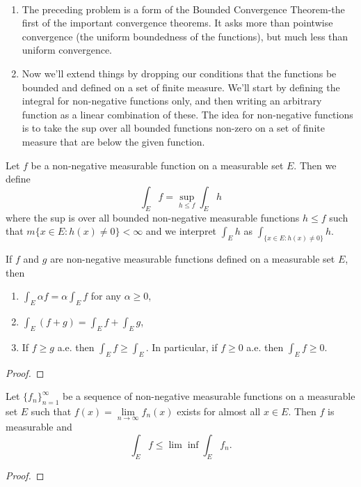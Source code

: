 \begin{rmk}~ %
\begin{enumerate}
	\item The preceding problem is a form of the Bounded Convergence Theorem-the first of 
	the important convergence theorems. It asks more than pointwise convergence (the 
	uniform boundedness of the functions), but much less than uniform convergence. 
	\item Now we'll extend things by dropping our conditions that the functions be bounded 
	and defined on a set of finite measure. We'll start by defining the integral for non-negative 
	functions only, and then writing an arbitrary function as a linear combination of these. The 
	idea for non-negative functions is to take the sup over all bounded functions non-zero on a set 
	of finite measure that are below the given function.
\end{enumerate}
\end{rmk}

\begin{defn}\label{d:thehundred}%
	Let $f$ be a non-negative measurable function on a measurable set $E$. Then we define 
	\begin{equation*}
		\int_E f = \sup\limits_{h\le f}\int_E h
	\end{equation*}
	where the sup is over all bounded non-negative measurable functions $h \le f$ such that 
	$m\{x \in E: h(x) \neq 0\} < \infty$ and we interpret $\int_E h$ as 
	$\int_{\{x\in E:h(x)\neq0\}}h$. 
\end{defn}

\begin{pblm}\label{p:conditionsnonnegmeasu}%
	If $f$ and $g$ are non-negative measurable functions defined on a measurable set $E$, then 
	\begin{enumerate}
		\item $\int_E \alpha f = \alpha \int_E f$ for any $\alpha \ge 0$, 
		\item $\int_E(f+g) = \int_E f + \int_E g$, 
		\item If $f \ge g$ a.e. then $\int_E f \ge \int_E$. In particular, if 
		$f \ge 0$ a.e. then $\int_E f \ge 0$. 
	\end{enumerate}
\begin{proof}
\end{proof}
\end{pblm}

\begin{pblm}\label{p:fatou}%
	Let $\{f_n\}_{n=1}^\infty$ be a sequence of non-negative measurable functions on a 
	measurable set $E$ such that $f(x) = \lim\limits_{n\to\infty}f_n(x)$ exists for almost 
	all $x \in E$. Then $f$ is measurable and 
	\begin{equation*}
		\int_E f \le \lim\inf\int_E f_n.
	\end{equation*}
\begin{proof}
\end{proof}
\end{pblm}

